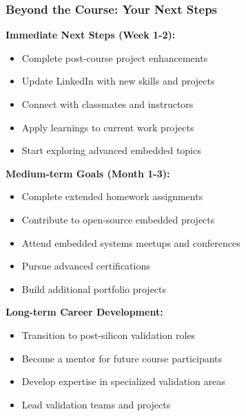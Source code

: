 \documentclass{beamer}
\begin{document}
\begin{frame}
\frametitle{Beyond the Course: Your Next Steps}
\textbf{Immediate Next Steps (Week 1-2):}
\begin{itemize}
    \item Complete post-course project enhancements
    \item Update LinkedIn with new skills and projects
    \item Connect with classmates and instructors
    \item Apply learnings to current work projects
    \item Start exploring advanced embedded topics
\end{itemize}

\vspace{0.5cm}
\textbf{Medium-term Goals (Month 1-3):}
\begin{itemize}
    \item Complete extended homework assignments
    \item Contribute to open-source embedded projects
    \item Attend embedded systems meetups and conferences
    \item Pursue advanced certifications
    \item Build additional portfolio projects
\end{itemize}

\vspace{0.5cm}
\textbf{Long-term Career Development:}
\begin{itemize}
    \item Transition to post-silicon validation roles
    \item Become a mentor for future course participants
    \item Develop expertise in specialized validation areas
    \item Lead validation teams and projects
\end{itemize}
\end{frame}
\end{document}
